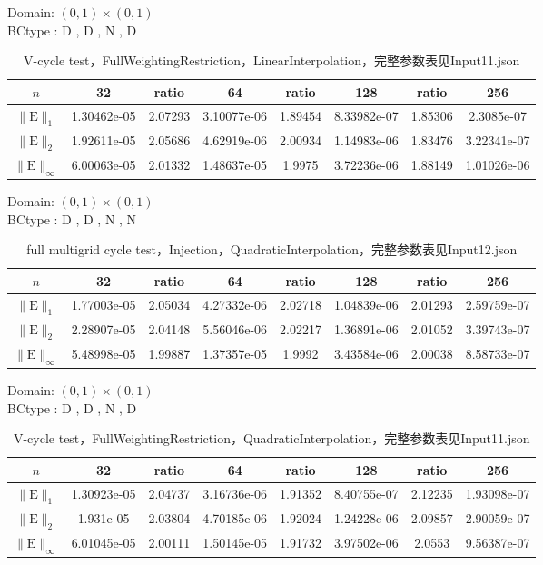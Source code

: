 \documentclass[a4paper,twoside]{ctexart}
\begin{document}
\noindent Domain: $(0,1)\times(0,1)$\\
BCtype : D , D , N , D
\begin{table}[htbp]
\centering\begin{tabular}{c|ccccccc}
\hline
$n$&32&ratio&64&ratio&128&ratio&256\\
\hline
$\|\mathrm{E}\|_1$&1.30462e-05&2.07293&3.10077e-06&1.89454&8.33982e-07&1.85306&2.3085e-07\\
\hline
$\|\mathrm{E}\|_2$&1.92611e-05&2.05686&4.62919e-06&2.00934&1.14983e-06&1.83476&3.22341e-07\\
\hline
$\|\mathrm{E}\|_{\infty}$&6.00063e-05&2.01332&1.48637e-05&1.9975&3.72236e-06&1.88149&1.01026e-06\\
\hline
\end{tabular}
\caption{V-cycle test，FullWeightingRestriction，LinearInterpolation，完整参数表见Input11.json}
\end{table}

\noindent Domain: $(0,1)\times(0,1)$\\
BCtype : D , D , N , N
\begin{table}[htbp]
\centering\begin{tabular}{c|ccccccc}
\hline
$n$&32&ratio&64&ratio&128&ratio&256\\
\hline
$\|\mathrm{E}\|_1$&1.77003e-05&2.05034&4.27332e-06&2.02718&1.04839e-06&2.01293&2.59759e-07\\
\hline
$\|\mathrm{E}\|_2$&2.28907e-05&2.04148&5.56046e-06&2.02217&1.36891e-06&2.01052&3.39743e-07\\
\hline
$\|\mathrm{E}\|_{\infty}$&5.48998e-05&1.99887&1.37357e-05&1.9992&3.43584e-06&2.00038&8.58733e-07\\
\hline
\end{tabular}
\caption{full multigrid cycle test，Injection，QuadraticInterpolation，完整参数表见Input12.json}
\end{table}

\noindent Domain: $(0,1)\times(0,1)$\\
BCtype : D , D , N , D
\begin{table}[htbp]
\centering\begin{tabular}{c|ccccccc}
\hline
$n$&32&ratio&64&ratio&128&ratio&256\\
\hline
$\|\mathrm{E}\|_1$&1.30923e-05&2.04737&3.16736e-06&1.91352&8.40755e-07&2.12235&1.93098e-07\\
\hline
$\|\mathrm{E}\|_2$&1.931e-05&2.03804&4.70185e-06&1.92024&1.24228e-06&2.09857&2.90059e-07\\
\hline
$\|\mathrm{E}\|_{\infty}$&6.01045e-05&2.00111&1.50145e-05&1.91732&3.97502e-06&2.0553&9.56387e-07\\
\hline
\end{tabular}
\caption{V-cycle test，FullWeightingRestriction，QuadraticInterpolation，完整参数表见Input11.json}
\end{table}
\end{document}
